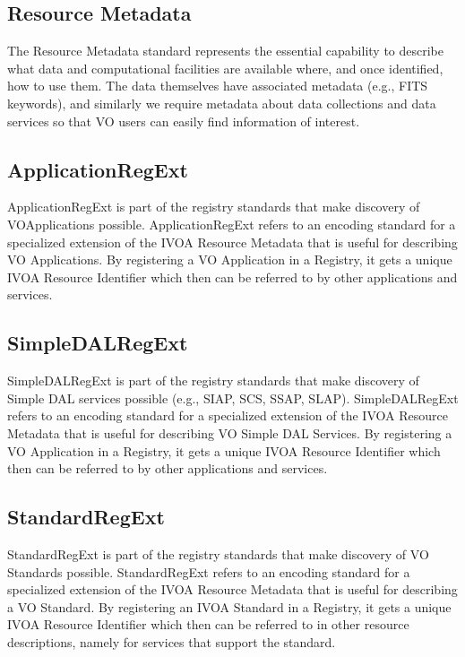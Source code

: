 \documentclass[11pt,a4paper]{ivoa}
\begin{document}
\subsection{Resource Metadata}

The Resource Metadata standard represents the essential capability to describe what data and computational facilities are available where, and once identified, how to use them.  The data themselves have associated metadata (e.g., FITS keywords), and similarly we require metadata about data collections and data services so that VO users can easily find information of interest.  

\subsection{ApplicationRegExt}

ApplicationRegExt is part of the registry standards that make discovery of VOApplications possible.  ApplicationRegExt refers to an encoding standard for a specialized extension of the IVOA Resource Metadata that is useful for describing VO Applications.  By registering a VO Application in a Registry, it gets a unique IVOA Resource Identifier which then can be referred to by other applications and services. 

\subsection{SimpleDALRegExt}

SimpleDALRegExt is part of the registry standards that make discovery of Simple DAL services possible (e.g., SIAP, SCS, SSAP, SLAP).  SimpleDALRegExt refers to an encoding standard for a specialized extension of the IVOA Resource Metadata that is useful for describing VO Simple DAL Services.  By registering a VO Application in a Registry, it gets a unique IVOA Resource Identifier which then can be referred to by other applications and services. 

\subsection{StandardRegExt}

StandardRegExt is part of the registry standards that make discovery of VO Standards possible.  StandardRegExt refers to an encoding standard for a specialized extension of the IVOA Resource Metadata that is useful for describing a VO Standard.  By registering an IVOA Standard in a Registry, it gets a unique IVOA Resource Identifier which then can be referred to in other resource descriptions, namely for services that support the standard.
\end{document}

